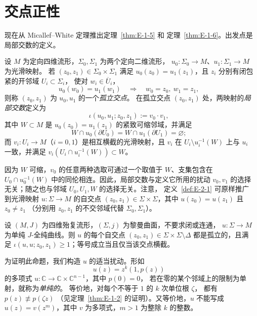 
\section{交点正性}\label{sec:E-2}

现在从 Micallef--White 定理推出定理~\ref{thm:E-1-5} 和
定理~\ref{thm:E-1-6}。出发点是局部交数的定义。

\begin{definition}\label{def:E-2-1}
设 $M$ 为定向四维流形，$\Sigma_0,\Sigma_1$ 为两个定向二维流形，
$u_0:\Sigma_0\to M$、$u_1:\Sigma_1\to M$ 为光滑映射。
若 $(z_0,z_1)\in\Sigma_0\times\Sigma_1$ 满足
$u_0(z_0)=u_1(z_1)$，且 $z_i$ 分别有闭包紧的开邻域 $U_i\subset\Sigma_i$，
使对 $w_i\in\overline U_i$，
\[
  u_0(w_0)=u_1(w_1)\quad\Longrightarrow\quad w_0=z_0,\ w_1=z_1,
\]
则称 $(z_0,z_1)$ 为 $u_0,u_1$ 的一个\emph{孤立交点}。
在孤立交点 $(z_0,z_1)$ 处，两映射的\emph{局部交数}定义为
\[
  \iota(u_0,u_1;z_0,z_1):=v_0\cdot v_1,
\]
其中 $W\subset M$ 是 $u_0(z_0)=u_1(z_1)$ 的紧致可缩邻域，并满足
\[
  W\cap u_0(\partial U_0)=W\cap u_1(\partial U_1)=\varnothing;
\]
而 $v_i:U_i\to M$（$i=0,1$）是相互横截的光滑映射，且
$v_i$ 在 $U_i\setminus u_i^{-1}(W)$ 上与 $u_i$ 一致，并满足
$v_i(U_i\cap u_i^{-1}(W))\subset W$。

因为 $W$ 可缩，$v_0$ 的任意两种选取可通过一个取值于 $W$、支集包含在
$U_0\cap u_0^{-1}(W)$ 中的同伦相连。因此，局部交数与定义它所用的扰动
$v_0,v_1$ 的选择无关；随之也与邻域 $U_0,U_1,W$ 的选择无关。注意，
定义~\ref{def:E-2-1} 可原样推广到光滑映射 $u:\Sigma\to M$ 的自交点
$(z_0,z_1)\in\Sigma\times\Sigma$，其中 $u(z_0)=u(z_1)$ 且 $z_0\ne z_1$
（分别用 $z_0,z_1$ 的不交邻域代替 $\Sigma_0,\Sigma_1$）。
\end{definition}

\begin{proposition}\label{prop:E-2-2}
设 $(M,J)$ 为四维殆复流形，$(\Sigma,j)$ 为黎曼曲面，不要求闭或连通，
$u:\Sigma\to M$ 为单纯 $J$-全纯曲线。则 $u$ 的每个自交点
$(z_0,z_1)\in\Sigma\times\Sigma\setminus\Delta$ 都是孤立的，且满足
$\iota(u,u;z_0,z_1)\ge1$；等号成立当且仅当该交点横截。
\end{proposition}

为证明此命题，我们构造 $u$ 的适当扰动。形如
\[
  u(z)=z^k(1,p(z))
\]
的多项式 $u:\mathbb C\to\mathbb C\times\mathbb C^{n-1}$，其中 $p(0)=0$，
若在零的某个邻域上的限制为单射，就称为\emph{单纯的}。
等价地，对每个不等于 $1$ 的 $k$ 次单位根 $\zeta$，
都有 $p(z)\not\equiv p(\zeta z)$
（见定理~\ref{thm:E-1-2} 的证明）。又等价地，$u$ 不能写成
$u(z)=v(z^m)$，其中 $v$ 为多项式，$m>1$ 为整除 $k$ 的整数。

